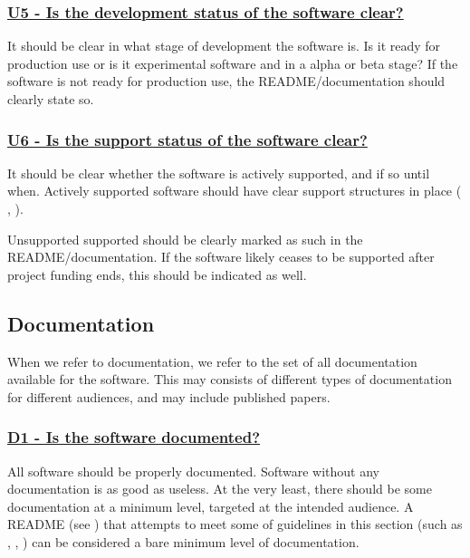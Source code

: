 \documentclass[a4paper,11pt]{article}
\newcommand{\criterion}[2]{\subsubsection*{\underline{#1 - #2}}\label{id:#1}}
\newcommand\CheckTable{%
  \begin{tabular}{ccccc}
    No & Minimal & Adequate & Good & Perfect \\
    0 & 1 & 2 & 3 & 4 \\
    \hline
    $\square$ & $\square$ & $\square$ & $\square$ & $\square$ \\
  \end{tabular}%
}
\newcommand{\refcrit}[1]{%
 \framebox[1.1\width]{\hyperref[id:#1]{#1}}
}
\begin{document}
\newcommand{\uFiveID}{U5}
\newcommand{\uFiveText}{Is the development status of the software clear?}
\criterion{\uFiveID}{\uFiveText}

It should be clear in what stage of development the software is. Is it ready for
production use or is it experimental software and in a alpha or beta stage? If
the software is not ready for production use, the README/documentation should clearly state
so.

\newcommand{\uSixID}{U6}
\newcommand{\uSixText}{Is the support status of the software clear?}
\criterion{\uSixID}{\uSixText}

It should be clear whether the software is actively supported, and if so until
when. Actively supported software should have clear support structures in
place (\refcrit{SP1}, \refcrit{SP2}).

Unsupported supported should be clearly marked as such in the
README/documentation. If the software likely ceases to be supported after project
funding ends, this should be indicated as well.


\subsection{Documentation}\label{sec:doc}

When we refer to documentation, we refer to the set of all documentation
available for the software. This may consists of different types of
documentation for different audiences, and may include published papers.

\newcommand{\dOneID}{D1}
\newcommand{\dOneText}{Is the software documented?}
\criterion{\dOneID}{\dOneText}

All software should be properly documented. Software without any documentation
is as good as useless. At the very least, there should be some documentation at
a minimum level, targeted at the intended audience. A README (see \refcrit{IS7}) that
attempts to meet some of guidelines in this section (such as
\refcrit{D6},\refcrit{D8},\refcrit{D9}) can be
considered a bare minimum level of documentation.


%
%
%
\end{document}
